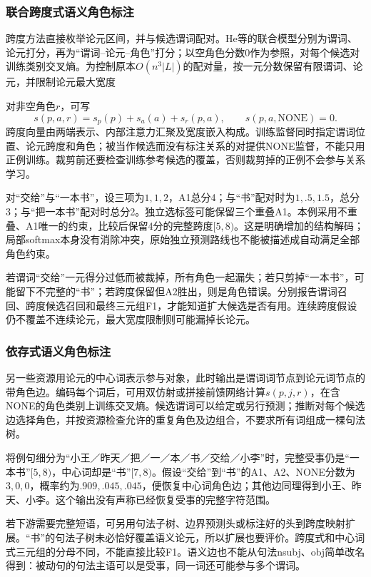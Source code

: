 \subsubsection{联合跨度式语义角色标注}
\label{sec:nlp-analysis-srl-span}

跨度方法直接枚举论元区间，并与候选谓词配对。He等的联合模型分别为谓词、论元打分，再为“谓词--论元--角色”打分；以空角色分数0作为参照，对每个候选对训练类别交叉熵。为控制原本$O(n^3|L|)$的配对量，按一元分数保留有限谓词、论元，并限制论元最大宽度

对非空角色$r$，可写
\[
 s(p,a,r)=s_p(p)+s_a(a)+s_r(p,a),\qquad
 s(p,a,\mathrm{NONE})=0.
\]
跨度向量由两端表示、内部注意力汇聚及宽度嵌入构成。训练监督同时指定谓词位置、论元跨度和角色；被当作候选而没有标注关系的对提供NONE监督，不能只用正例训练。裁剪前还要检查训练参考候选的覆盖，否则裁剪掉的正例不会参与关系学习。

对“交给”与“一本书”，设三项为$1,1,2$，A1总分4；与“书”配对时为$1,.5,1.5$，总分3；与“把一本书”配对时总分2。独立选标签可能保留三个重叠A1。本例采用不重叠、A1唯一的约束，比较后保留4分的完整跨度$[5,8)$。这是明确增加的结构解码；局部softmax本身没有消除冲突，原始独立预测路线也不能被描述成自动满足全部角色约束。

若谓词“交给”一元得分过低而被裁掉，所有角色一起漏失；若只剪掉“一本书”，可能留下不完整的“书”；若跨度保留但A2胜出，则是角色错误。分别报告谓词召回、跨度候选召回和最终三元组F1，才能知道扩大候选是否有用。连续跨度假设仍不覆盖不连续论元，最大宽度限制则可能漏掉长论元。

\subsubsection{依存式语义角色标注}
\label{sec:nlp-analysis-srl-dependency}

另一些资源用论元的中心词表示参与对象，此时输出是谓词词节点到论元词节点的带角色边。编码每个词后，可用双仿射或拼接前馈网络计算$s(p,j,r)$，在含NONE的角色类别上训练交叉熵。候选谓词可以给定或另行预测；推断对每个候选边选择角色，并按资源检查允许的重复角色及边组合，不要求所有词组成一棵句法树。

将例句细分为“小王／昨天／把／一／本／书／交给／小李”时，完整受事仍是“一本书”$[5,8)$，中心词却是“书”$[7,8)$。假设“交给”到“书”的A1、A2、NONE分数为$3,0,0$，概率约为$.909,.045,.045$，便恢复中心词角色边；其他边同理得到小王、昨天、小李。这个输出没有声称已经恢复受事的完整字符范围。

若下游需要完整短语，可另用句法子树、边界预测头或标注好的头到跨度映射扩展。“书”的句法子树未必恰好覆盖语义论元，所以扩展也要评价。跨度式和中心词式三元组的分母不同，不能直接比较F1。语义边也不能从句法nsubj、obj简单改名得到：被动句的句法主语可以是受事，同一词还可能参与多个谓词。

